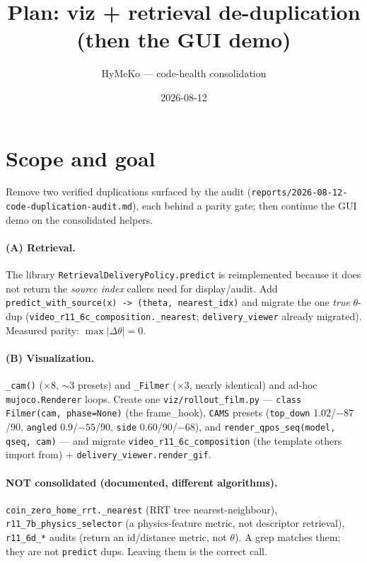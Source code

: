 \documentclass[11pt]{article}
\title{Plan: viz + retrieval de-duplication (then the GUI demo)}
\author{HyMeKo — code-health consolidation}
\date{2026-08-12}
\begin{document}
\maketitle

\section{Scope and goal}
Remove two verified duplications surfaced by the audit
(\texttt{reports/2026-08-12-code-duplication-audit.md}), each behind a parity gate; then continue the GUI demo on the
consolidated helpers.

\paragraph{(A) Retrieval.} The library \texttt{RetrievalDeliveryPolicy.predict} is reimplemented because it does not
return the \emph{source index} callers need for display/audit. Add \texttt{predict\_with\_source(x) -> (theta,
nearest\_idx)} and migrate the one \emph{true} $\theta$-dup (\texttt{video\_r11\_6c\_composition.\_nearest};
\texttt{delivery\_viewer} already migrated). Measured parity: $\max|\Delta\theta| = 0$.

\paragraph{(B) Visualization.} \texttt{\_cam()} ($\times 8$, $\sim$3 presets) and \texttt{\_Filmer} ($\times 3$, nearly
identical) and ad-hoc \texttt{mujoco.Renderer} loops. Create one \texttt{viz/rollout\_film.py} —
\texttt{class Filmer(cam, phase=None)} (the frame\_hook), \texttt{CAMS} presets (\texttt{top\_down} 1.02/$-87$/90,
\texttt{angled} 0.9/$-55$/90, \texttt{side} 0.60/90/$-68$), and \texttt{render\_qpos\_seq(model, qseq, cam)} — and
migrate \texttt{video\_r11\_6c\_composition} (the template others import from) + \texttt{delivery\_viewer.render\_gif}.

\paragraph{NOT consolidated (documented, different algorithms).} \texttt{coin\_zero\_home\_rrt.\_nearest} (RRT tree
nearest-neighbour), \texttt{r11\_7b\_physics\_selector} (a physics-feature metric, not descriptor retrieval),
\texttt{r11\_6d\_*} audits (return an id/distance metric, not $\theta$). A grep matches them; they are not
\texttt{predict} dups. Leaving them is the correct call.
\end{document}
